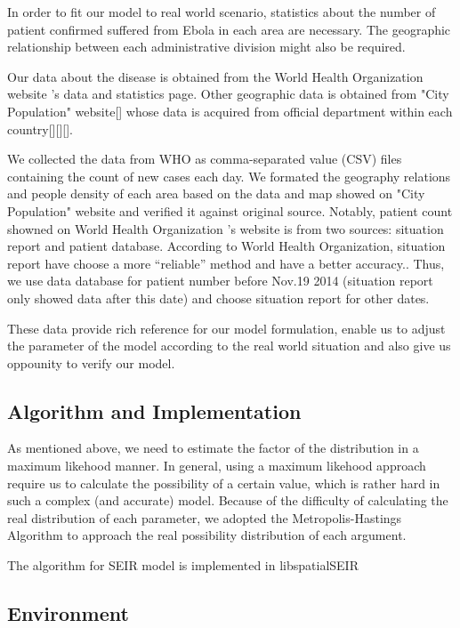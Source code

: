 \documentclass[11pt]{article}
\begin{document}
In order to fit our model to real world scenario, statistics about the number of patient confirmed suffered from Ebola in each area are necessary. The geographic relationship between each administrative division might also be required.

Our data about the disease is obtained from the World Health Organization website 's data and statistics page. Other geographic data is obtained from "City Population" website[] whose data is acquired from official department within each country[][][].

We collected the data from WHO as comma-separated value (CSV) files containing the count of new cases each day. We formated the geography relations and people density of each area based on the data and map showed on "City Population" website and verified it against original source. Notably, patient count showned on World Health Organization 's website is from two sources: situation report and patient database. According to World Health Organization, situation report have choose a more ``reliable'' method and have a better accuracy.\cite{whositrep}. Thus, we use data database for patient number before Nov.19 2014 (situation report only showed data after this date) and choose situation report for other dates. 

These data provide rich reference for our model formulation, enable us to adjust the parameter of the model according to the real world situation and also give us oppounity to verify our model.

\subsection{Algorithm and Implementation}

As mentioned above, we need to estimate the factor of the distribution in a maximum likehood manner. In general, using a maximum likehood approach require us to calculate  the possibility of a certain value, which is rather hard in such a complex (and accurate) model. Because of the difficulty of calculating the real distribution of each parameter, we adopted the Metropolis-Hastings Algorithm\cite{besag1993spatial} to approach the real possibility distribution of each argument.

The algorithm for SEIR model is implemented in libspatialSEIR

\subsection{Environment}
\end{document}
